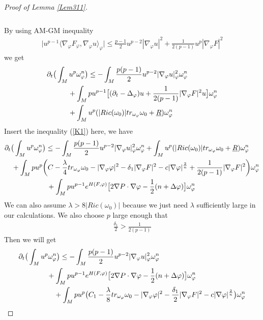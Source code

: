 \documentclass[11pt]{amsart}
\numberwithin{equation}{section}
\begin{document}
\begin{proof}[Proof of Lemma \ref{Lem311}]
\begin{align}
\end{align}	\\
By using AM-GM inequality 
\begin{align}
	\big|u^{p-1}\langle \nabla_\varphi F_\varphi, \nabla_\varphi u \rangle_\varphi\big| \le  \frac{p-1}{2} u^{p-2}|\nabla_\varphi u|^2+ \frac{1}{2(p-1)}u^p|\nabla_\varphi F|^2
\end{align}
we get 
\begin{align}\label{K3}
	& \partial_t\big( \int_M u^p\omega_\varphi^n\big)\le  - \int_M \frac{p(p-1)}{2} u^{p-2} |\nabla_\varphi u|^2_\varphi\omega_\varphi^n \notag\\
	&\quad\quad\quad +\int_M pu^{p-1}\big[(\partial_t-\Delta_\varphi)u+  \frac{1}{2(p-1)}|\nabla_\varphi F|^2 u  \big]\omega_\varphi^n \notag\\
	&\quad\quad\quad +\int_M u^p(|Ric(\omega_0) |tr_{\omega_{\varphi}}\omega_0+\underline R)\omega_\varphi^n
\end{align}
Insert the inequality (\ref{K1}) here, we have 
\begin{align}
	& \partial_t\big( \int_M u^p\omega_\varphi^n\big)\le  - \int_M \frac{p(p-1)}{2} u^{p-2} |\nabla_\varphi u|^2_\varphi\omega_\varphi^n +\int_M u^p(|Ric(\omega_0)|tr_{\omega_{\varphi}}\omega_0+\underline R)\omega_\varphi^n \notag\\
	&\quad +\int_M pu^{p}\bigg( C -\frac{\lambda}{4}tr_{\omega_{\varphi}}\omega_0 -|\nabla_\varphi\varphi|^2 -\delta_1|\nabla_\varphi F|^2 - c|\nabla\varphi|^{\frac{2}{n}} +  \frac{1}{2(p-1)}|\nabla_\varphi F|^2   \bigg)\omega_\varphi^n \notag\\
	& \quad\quad\quad\quad\qquad +\int_M pu^{p-1}e^{H(F,\varphi)}\big[2\nabla P\cdot\nabla\varphi -\frac{1}{2}(n+\Delta\varphi)\big]\omega_\varphi^n
\end{align}
We can also assume $\lambda>8|Ric(\omega_0)|$ because we just need $\lambda$ sufficiently large in our calculations. We also choose $p$ large enough that 
\begin{align}
	\frac{\delta_1}{2}>\frac{1}{2(p-1)}
\end{align}
Then we will get 
\begin{align}\label{K2}
	& \partial_t\big( \int_M u^p\omega_\varphi^n\big)\le  - \int_M \frac{p(p-1)}{2} u^{p-2} |\nabla_\varphi u|^2_\varphi\omega_\varphi^n \notag\\
	&\qquad\qquad +\int_M pu^{p-1}e^{H(F,\varphi)}\big[2\nabla P\cdot\nabla\varphi -\frac{1}{2}(n+\Delta\varphi)\big]\omega_\varphi^n \notag\\
	&\qquad\qquad\quad +\int_M pu^{p} \big(C_1 -\frac{\lambda}{8}tr_{\omega_{\varphi}}\omega_0 -|\nabla_\varphi\varphi|^2  -\frac{\delta_1}{2} |\nabla_\varphi F|^2 - c|\nabla\varphi|^{\frac{2}{n}}  \big) \omega_\varphi^n

\end{align}
\end{proof}
\end{document}
